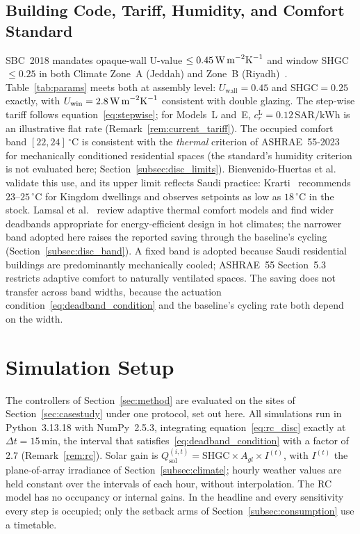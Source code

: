 \documentclass[3p,twocolumn,number]{elsarticle}
\newcommand{\SAR}{\text{SAR}}
\newcommand{\kWh}{\text{kWh}}
\begin{document}
 
\subsection{Building Code, Tariff, Humidity, and Comfort Standard}
\label{subsec:sbc}
 
SBC~2018 mandates opaque-wall U-value $\le0.45\,\text{W\,m}^{-2}\text{K}^{-1}$ and window SHGC $\le0.25$ in both Climate Zone~A (Jeddah) and Zone~B (Riyadh)~\cite{Alayed2021}. Table~\ref{tab:params} meets both at assembly level: $U_{\mathrm{wall}}=0.45$ and $\mathrm{SHGC}=0.25$ exactly, with $U_{\mathrm{win}}=2.8\,\text{W\,m}^{-2}\text{K}^{-1}$ consistent with double glazing. The step-wise tariff follows equation~\eqref{eq:stepwise}; for Models~L and~E, $c_r^{\mathrm{L}}=0.12\,\SAR/\kWh$ is an illustrative flat rate (Remark~\ref{rem:current_tariff}). The occupied comfort band $[22,24]\,^\circ$C is consistent with the \emph{thermal} criterion of ASHRAE~55-2023~\cite{ASHRAE55_2023} for mechanically conditioned residential spaces (the standard's humidity criterion is not evaluated here; Section~\ref{subsec:disc_limits}). Bienvenido-Huertas et al.~\cite{Bienvenido2024} validate this use, and its upper limit reflects Saudi practice: Krarti~\cite{Krarti2020occ} recommends $23$--$25\,^\circ$C for Kingdom dwellings and observes setpoints as low as $18\,^\circ$C in the stock. Lamsal et al.~\cite{Lamsal2023} review adaptive thermal comfort models and find wider deadbands appropriate for energy-efficient design in hot climates; the narrower band adopted here raises the reported saving through the baseline's cycling (Section~\ref{subsec:disc_band}). A fixed band is adopted because Saudi residential buildings are predominantly mechanically cooled; ASHRAE~55 Section~5.3 restricts adaptive comfort to naturally ventilated spaces. The saving does not transfer across band widths, because the actuation condition~\eqref{eq:deadband_condition} and the baseline's cycling rate both depend on the width.
 
 
\section{Simulation Setup}
\label{sec:sim}
 
The controllers of Section~\ref{sec:method} are evaluated on the sites of Section~\ref{sec:casestudy} under one protocol, set out here. All simulations run in Python~3.13.18 with NumPy~2.5.3, integrating equation~\eqref{eq:rc_disc} exactly at $\Delta t=15\,$min, the interval that satisfies~\eqref{eq:deadband_condition} with a factor of $2.7$ (Remark~\ref{rem:rc}). Solar gain is $Q_{\mathrm{sol}}^{(i,t)}=\text{SHGC}\times A_{gl}\times I^{(t)}$, with $I^{(t)}$ the plane-of-array irradiance of Section~\ref{subsec:climate}; hourly weather values are held constant over the intervals of each hour, without interpolation. The RC model has no occupancy or internal gains. In the headline and every sensitivity every step is occupied; only the setback arms of Section~\ref{subsec:consumption} use a timetable.
\end{document}
